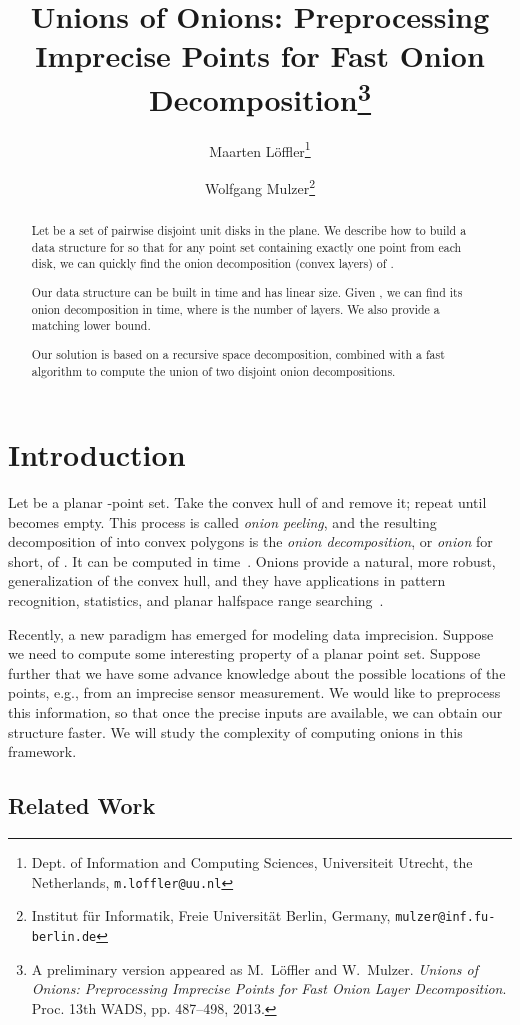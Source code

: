 \documentclass{paper}
\title{Unions of Onions: 
   Preprocessing Imprecise Points for Fast Onion
   Decomposition\thanks{A preliminary version appeared as 
   M.~L\"offler and W.~Mulzer. \emph{Unions of Onions: Preprocessing 
   Imprecise Points for Fast Onion Layer Decomposition}.
   Proc. 13th WADS, pp. 487--498, 2013.}
}
\author
{
  Maarten L\"offler\thanks{
    Dept. of Information and Computing Sciences, 
      Universiteit Utrecht, the Netherlands,
    \texttt{m.loffler@uu.nl}}
   \and Wolfgang Mulzer\thanks{
    Institut f\"ur Informatik, Freie Universit\"at Berlin, Germany, 
    \texttt{mulzer@inf.fu-berlin.de}
    }
}
\begin{document}
\maketitle

\begin{abstract}
   Let  be a set of  pairwise disjoint unit disks in the plane.
   We describe how to build a data structure for  so that
   for any point set  containing
   exactly one point from each disk, we can quickly find the
   onion decomposition (convex layers) of .

   Our data structure can be built in  time
   and has linear size. Given , we can find its 
   onion decomposition in  time, where  is the number of layers.
   We also provide a matching lower bound.
   
   Our solution is based on a recursive space decomposition,
   combined with a fast algorithm to compute the union of two disjoint onion 
   decompositions.
\end{abstract}


\section {Introduction}

Let  be a planar -point set. Take the convex hull of  and remove
it; repeat until  becomes empty.
This process is called \emph{onion peeling}, and the resulting
decomposition of  into convex polygons is the
\emph{onion decomposition}, or \emph {onion} for short, of .
It can be computed in  time~\cite {c-clps-85}.
Onions provide a natural, more robust, generalization of the convex hull,
and they have applications in pattern recognition, statistics, and 
planar halfspace range searching~\cite{cgl-tpogd-85,h-rsar-72,sf-clntrpdps-99}.

Recently, a new paradigm has emerged for modeling data
imprecision.
Suppose we need to compute some interesting property of
a planar point set. Suppose further that we have some advance
knowledge about the possible locations of the points, e.g.,
from an imprecise sensor measurement. We would like to preprocess
this information, so that once the precise inputs are available,
we can obtain our structure faster.
We will study  the complexity of computing onions
in this framework.

\subsection{Related Work}
\end{document}
